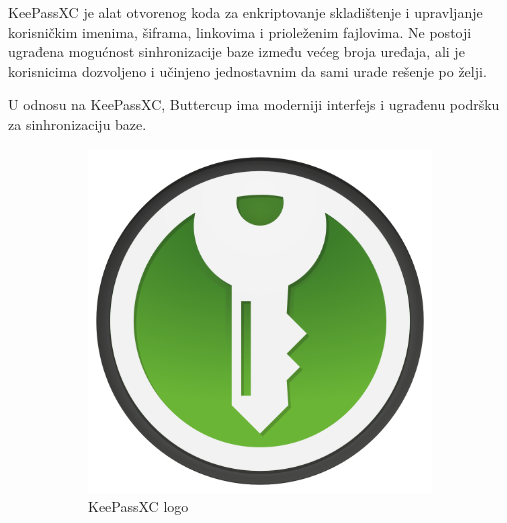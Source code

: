 \documentclass[fleqn, 12pt]{article}
\begin{document}
KeePassXC je alat otvorenog koda za enkriptovanje skladištenje i upravljanje korisničkim imenima, šiframa, linkovima i prioleženim fajlovima. Ne postoji ugrađena mogućnost sinhronizacije baze između većeg broja uređaja, ali je korisnicima dozvoljeno i učinjeno jednostavnim da sami urade rešenje po želji. \cite{keepassxc}

U odnosu na KeePassXC, Buttercup ima moderniji interfejs i ugrađenu podršku za sinhronizaciju baze. \cite{buttercup}


\begin{figure}[h]
    \centering
    \begin{subfigure}[b]{0.45\linewidth}
        \centering
        \includegraphics[width=\linewidth]{keepassXC_logo.png}
        \caption{KeePassXC logo}
        \label{fig:image1}
    \end{subfigure}
    \hfill
    \begin{subfigure}[b]{0.45\linewidth}
        \centering

\end{subfigure}
\end{figure}
\end{document}
